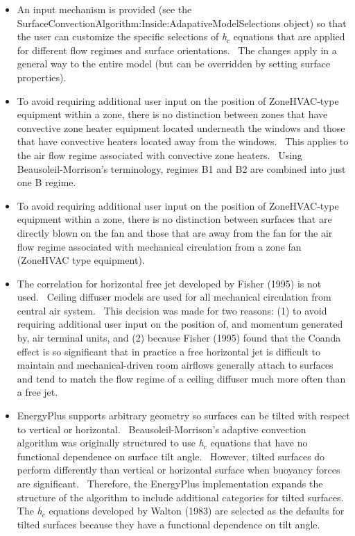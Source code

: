 \begin{itemize}
\item
  An input mechanism is provided (see the \\
SurfaceConvectionAlgorithm:Inside:AdapativeModelSelections object) so that the user can customize the specific selections of \emph{h\(_{c}\)} equations that are applied for different flow regimes and surface orientations.~ The changes apply in a general way to the entire model (but can be overridden by setting surface properties).
\item
  To avoid requiring additional user input on the position of ZoneHVAC-type equipment within a zone, there is no distinction between zones that have convective zone heater equipment located underneath the windows and those that have convective heaters located away from the windows.~ This applies to the air flow regime associated with convective zone heaters.~ Using Beausoleil-Morrison's terminology, regimes B1 and B2 are combined into just one B regime.
\item
  To avoid requiring additional user input on the position of ZoneHVAC-type equipment within a zone, there is no distinction between surfaces that are directly blown on the fan and those that are away from the fan for the air flow regime associated with mechanical circulation from a zone fan (ZoneHVAC type equipment).
\item
  The correlation for horizontal free jet developed by Fisher (1995) is not used.~ Ceiling diffuser models are used for all mechanical circulation from central air system.~ This decision was made for two reasons: (1) to avoid requiring additional user input on the position of, and momentum generated by, air terminal units, and (2) because Fisher (1995) found that the Coanda effect is so significant that in practice a free horizontal jet is difficult to maintain and mechanical-driven room airflows generally attach to surfaces and tend to match the flow regime of a ceiling diffuser much more often than a free jet.
\item
  EnergyPlus supports arbitrary geometry so surfaces can be tilted with respect to vertical or horizontal.~ Beausoleil-Morrison's adaptive convection algorithm was originally structured to use \emph{h\(_{c}\)} equations that have no functional dependence on surface tilt angle.~ However, tilted surfaces do perform differently than vertical or horizontal surface when buoyancy forces are significant.~ Therefore, the EnergyPlus implementation expands the structure of the algorithm to include additional categories for tilted surfaces.~ The \emph{h\(_{c}\)} equations developed by Walton (1983) are selected as the defaults for tilted surfaces because they have a functional dependence on tilt angle.

\end{itemize}
